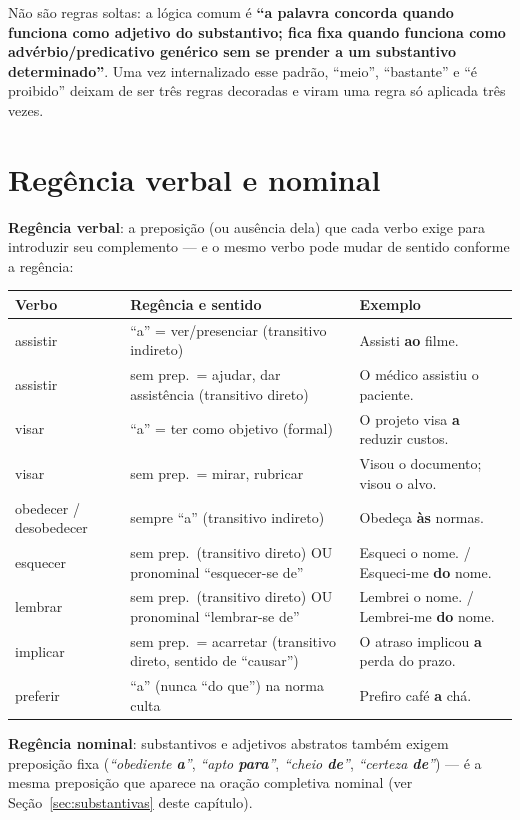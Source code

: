 \begin{cuidado}
Não são regras soltas: a lógica comum é \textbf{“a palavra concorda quando
funciona como adjetivo do substantivo; fica fixa quando funciona como
advérbio/predicativo genérico sem se prender a um substantivo
determinado”}. Uma vez internalizado esse padrão, “meio”, “bastante” e “é
proibido” deixam de ser três regras decoradas e viram uma regra só aplicada
três vezes.
\end{cuidado}

\section{Regência verbal e nominal}

\begin{conceito}
\textbf{Regência verbal}: a preposição (ou ausência dela) que cada verbo
exige para introduzir seu complemento --- e o mesmo verbo pode mudar de
sentido conforme a regência:

\begin{center}
\begin{tabular}{@{}p{2.4cm}p{4.6cm}p{4.4cm}@{}}
\toprule
\textbf{Verbo} & \textbf{Regência e sentido} & \textbf{Exemplo} \\
\midrule
assistir & “a” = ver/presenciar (transitivo indireto) & Assisti \textbf{ao} filme. \\
assistir & sem prep.\ = ajudar, dar assistência (transitivo direto) & O médico assistiu o paciente. \\
visar & “a” = ter como objetivo (formal) & O projeto visa \textbf{a} reduzir custos. \\
visar & sem prep.\ = mirar, rubricar & Visou o documento; visou o alvo. \\
obedecer / desobedecer & sempre “a” (transitivo indireto) & Obedeça \textbf{às} normas. \\
esquecer & sem prep.\ (transitivo direto) OU pronominal “esquecer-se de” & Esqueci o nome. / Esqueci-me \textbf{do} nome. \\
lembrar & sem prep.\ (transitivo direto) OU pronominal “lembrar-se de” & Lembrei o nome. / Lembrei-me \textbf{do} nome. \\
implicar & sem prep.\ = acarretar (transitivo direto, sentido de “causar”) & O atraso implicou \textbf{a} perda do prazo. \\
preferir & “a” (nunca “do que”) na norma culta & Prefiro café \textbf{a} chá. \\
\bottomrule
\end{tabular}
\end{center}

\textbf{Regência nominal}: substantivos e adjetivos abstratos também exigem
preposição fixa (\textit{“obediente \textbf{a}”}, \textit{“apto
\textbf{para}”}, \textit{“cheio \textbf{de}”}, \textit{“certeza
\textbf{de}”}) --- é a mesma preposição que aparece na oração completiva
nominal (ver Seção~\ref{sec:substantivas} deste capítulo).
\end{conceito}

